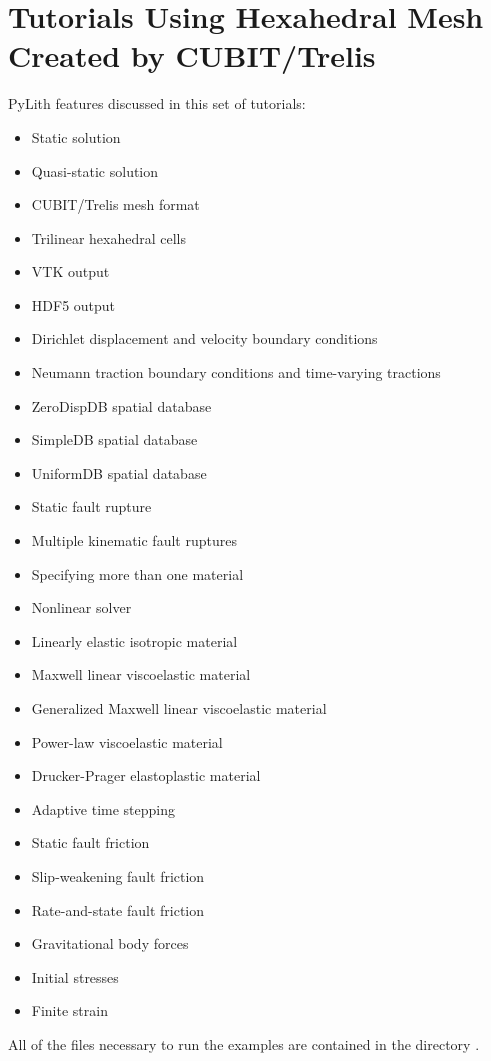 \section{Tutorials Using Hexahedral Mesh Created by CUBIT/Trelis}
\label{sec:example:3dhex8}

PyLith features discussed in this set of tutorials:
\begin{itemize}
\item Static solution
\item Quasi-static solution
\item CUBIT/Trelis mesh format
\item Trilinear hexahedral cells
\item VTK output
\item HDF5 output
\item Dirichlet displacement and velocity boundary conditions
\item Neumann traction boundary conditions and time-varying tractions
\item ZeroDispDB spatial database
\item SimpleDB spatial database
\item UniformDB spatial database
\item Static fault rupture
\item Multiple kinematic fault ruptures
\item Specifying more than one material
\item Nonlinear solver
\item Linearly elastic isotropic material
\item Maxwell linear viscoelastic material
\item Generalized Maxwell linear viscoelastic material
\item Power-law viscoelastic material
\item Drucker-Prager elastoplastic material
\item Adaptive time stepping
\item Static fault friction
\item Slip-weakening fault friction
\item Rate-and-state fault friction
\item Gravitational body forces
\item Initial stresses
\item Finite strain
\end{itemize}
All of the files necessary to run the examples are contained in the
directory .


